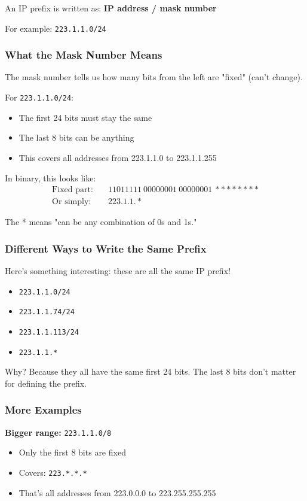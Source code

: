 \documentclass[../../compsys.tex]{subfiles}
\begin{document}
An IP prefix is written as: \textbf{IP address / mask number}

For example: \texttt{223.1.1.0/24}

\subsubsection{What the Mask Number Means}
The mask number tells us how many bits from the left are "fixed" (can't change).

For \texttt{223.1.1.0/24}:
\begin{itemize}
    \item The first 24 bits must stay the same
    \item The last 8 bits can be anything
    \item This covers all addresses from 223.1.1.0 to 223.1.1.255
\end{itemize}

In binary, this looks like:
\begin{align}
\text{Fixed part:} &\quad 11011111\ 00000001\ 00000001\ ******** \\
\text{Or simply:} &\quad 223.1.1.*
\end{align}

The * means "can be any combination of 0s and 1s."

\subsubsection{Different Ways to Write the Same Prefix}
Here's something interesting: these are all the same IP prefix!
\begin{itemize}
    \item \texttt{223.1.1.0/24}
    \item \texttt{223.1.1.74/24}
    \item \texttt{223.1.1.113/24}
    \item \texttt{223.1.1.*}
\end{itemize}

Why? Because they all have the same first 24 bits. The last 8 bits don't matter for defining the prefix.

\subsubsection{More Examples}
\textbf{Bigger range:} \texttt{223.1.1.0/8}
\begin{itemize}
    \item Only the first 8 bits are fixed
    \item Covers: \texttt{223.*.*.*}
    \item That's all addresses from 223.0.0.0 to 223.255.255.255
\end{itemize}
\end{document}

